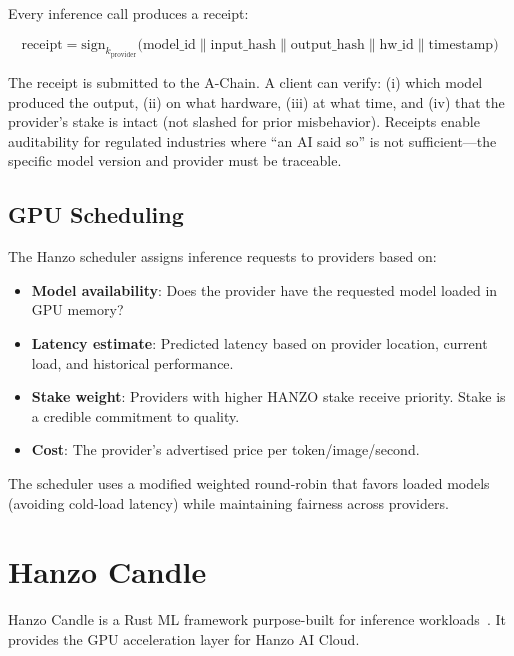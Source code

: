 \documentclass[11pt]{article}
\begin{document}
Every inference call produces a receipt:

\begin{equation}
\text{receipt} = \text{sign}_{k_{\text{provider}}}\bigl(
\text{model\_id} \| \text{input\_hash} \| \text{output\_hash} \|
\text{hw\_id} \| \text{timestamp}
\bigr)
\end{equation}

The receipt is submitted to the A-Chain. A client can verify: (i) which model
produced the output, (ii) on what hardware, (iii) at what time, and (iv) that
the provider's stake is intact (not slashed for prior misbehavior). Receipts
enable auditability for regulated industries where ``an AI said so'' is not
sufficient---the specific model version and provider must be traceable.

\subsection{GPU Scheduling}

The Hanzo scheduler assigns inference requests to providers based on:

\begin{itemize}[leftmargin=1.1em]
    \item \textbf{Model availability}: Does the provider have the requested
    model loaded in GPU memory?
    \item \textbf{Latency estimate}: Predicted latency based on provider
    location, current load, and historical performance.
    \item \textbf{Stake weight}: Providers with higher HANZO stake receive
    priority. Stake is a credible commitment to quality.
    \item \textbf{Cost}: The provider's advertised price per token/image/second.
\end{itemize}

The scheduler uses a modified weighted round-robin that favors loaded models
(avoiding cold-load latency) while maintaining fairness across providers.

\section{Hanzo Candle}
\label{sec:candle}

Hanzo Candle is a Rust ML framework purpose-built for inference
workloads~\cite{hanzocandle}. It provides the GPU acceleration layer for
Hanzo AI Cloud.
\end{document}
